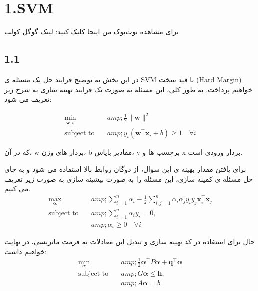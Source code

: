 \documentclass{article}
\begin{document}



\tableofcontents
\newpage


\section{1.SVM}

برای مشاهده نوت‌بوک من اینجا کلیک کنید:
 \href{https://drive.google.com/file/d/1nfyxbJQEZa4AznaHtXdWtNYiyUrZ2R4M/view?usp=sharing}{لینک گوگل کولب}
 
\subsection{1.1}

در این بخش به توضیح فرایند حل یک مسئله ی SVM با قید سخت (Hard Margin) خواهیم پرداخت.
به طور کلی، این مسئله به صورت یک فرایند بهینه سازی به شرح زیر تعریف می شود:

\begin{align*}
\min_{\mathbf{w}, b} \quad &amp; \frac{1}{2} \|\mathbf{w}\|^2 \\
\text{subject to} \quad &amp; y_i(\mathbf{w}^\top \mathbf{x}_i + b) \geq 1 \quad \forall i
\end{align*}


که در آن، w بردار های وزن، b  مقادیر بایاس، y برچسب ها و x بردار ورودی است.

برای یافتن مقدار بهینه ی این سوال، از دوگان روابط بالا استفاده می شود و به جای حل مسئله ی کمینه سازی، این مسئله را به صورت بیشینه سازی به صورت زیر تعریف می کنیم. 
    \begin{align*}
\max_{\boldsymbol{\alpha}} \quad &amp; \sum_{i=1}^n \alpha_i - \frac{1}{2} \sum_{i,j=1}^n \alpha_i \alpha_j y_i y_j \mathbf{x}_i^\top \mathbf{x}_j \\
\text{subject to} \quad &amp; \sum_{i=1}^n \alpha_i y_i = 0, \\
&amp; \alpha_i \geq 0 \quad \forall i
\end{align*}

حال برای استفاده در کد بهینه سازی و تبدیل این معادلات به فرمت ماتریسی، در نهایت خواهیم داشت:
    \begin{align*}
\min_{\boldsymbol{\alpha}} \quad &amp; \frac{1}{2} \boldsymbol{\alpha}^\top P \boldsymbol{\alpha} + \mathbf{q}^\top \boldsymbol{\alpha} \\
\text{subject to} \quad &amp; G \boldsymbol{\alpha} \leq \mathbf{h}, \\
&amp; A \boldsymbol{\alpha} = b
\end{align*}
\end{document}
